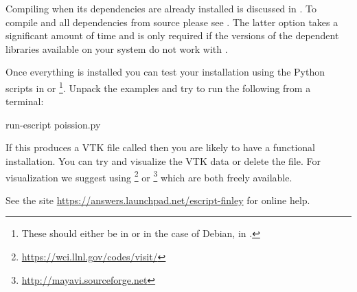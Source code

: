 Compiling \esfinley when its dependencies are already installed is discussed in .
To compile \esfinley and all dependencies from source please see .
The latter option takes a significant amount of time and is only required if the versions of the dependent libraries available on your system do not work with \esfinley.

Once everything is installed you can test your installation using the Python scripts in  or \footnote{These should either be in  or in the case of Debian, in .}.
Unpack the examples and try to run the following from a terminal:
\begin{shellCode}
 run-escript poission.py
\end{shellCode}
If this produces a VTK file called  then you are likely to have a functional \esfinley installation.
You can try and visualize the VTK data or delete the file.
For visualization we suggest using \footnote{\url{https://wci.llnl.gov/codes/visit/}} or \footnote{\url{http://mayavi.sourceforge.net}} which are both freely available.

See the site \url{https://answers.launchpad.net/escript-finley} for online help.
